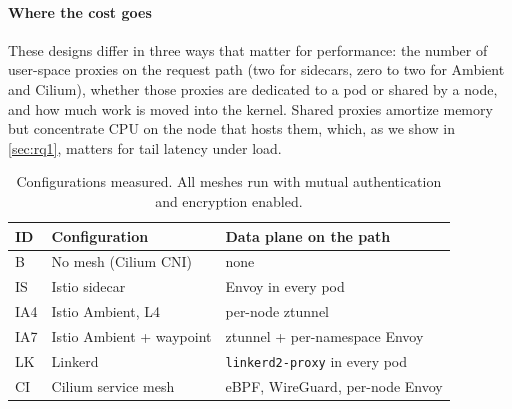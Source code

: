 \paragraph{Where the cost goes}
These designs differ in three ways that matter for performance: the number of
user-space proxies on the request path (two for sidecars, zero to two for
Ambient and Cilium), whether those proxies are dedicated to a pod or shared by
a node, and how much work is moved into the kernel. Shared proxies amortize
memory but concentrate CPU on the node that hosts them, which, as we show in
\cref{sec:rq1}, matters for tail latency under load.

\begin{table}[t]
  \centering
  \caption{Configurations measured. All meshes run with mutual authentication
           and encryption enabled.}
  \label{tab:configs}
  \footnotesize
  \setlength{\tabcolsep}{4pt}
  \begin{tabular}{@{}lll@{}}
    \toprule
    ID  & Configuration            & Data plane on the path \\
    \midrule
    B   & No mesh (Cilium CNI)     & none \\
    IS  & Istio sidecar            & Envoy in every pod \\
    IA4 & Istio Ambient, L4        & per-node ztunnel \\
    IA7 & Istio Ambient + waypoint & ztunnel + per-namespace Envoy \\
    LK  & Linkerd                  & \texttt{linkerd2-proxy} in every pod \\
    CI  & Cilium service mesh      & eBPF, WireGuard, per-node Envoy \\
    \bottomrule
  \end{tabular}
\end{table}
